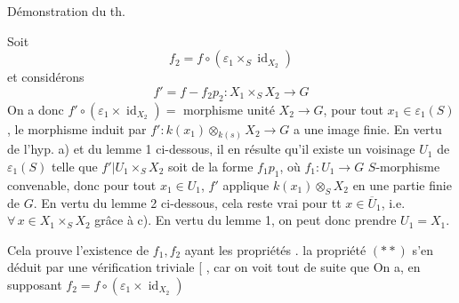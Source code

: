 Démonstration du th.

Soit
\[
f_2=f\circ(\varepsilon_1\times_S\operatorname{id}_{X_2})
\]
et considérons
\[
f'=f-f_2p_2:X_1\times_S X_2\longrightarrow G
\]
  On a donc $f'\circ(\varepsilon_1\times\operatorname{id}_{X_2})={}$ morphisme unité $X_2\to G$,   pour tout $x_1\in\varepsilon_1(S)$, le morphisme induit par $f':k(x_1)\otimes_{k(s)}X_2\longrightarrow G$  a une image finie. En vertu de l'hyp. a) et du lemme 1 ci-dessous, il en résulte qu'il existe un voisinage $U_1$ de $\varepsilon_1(S)$ telle que $f'|U_1\times_S X_2$ soit de la forme $f_1p_1$, où $f_1:U_1\longrightarrow G$  $S$-morphisme convenable, donc pour tout $x_1\in U_1$, $f'$ applique $k(x_1)\otimes_S X_2$ en une partie finie de $G$. En vertu du lemme 2 ci-dessous,  cela reste vrai pour tt $x\in\overline U_1$, i.e. $\forall\,x\in X_1\times_S X_2$ grâce à c). En vertu du lemme 1, on peut donc prendre $U_1=X_1$.

Cela prouve l'existence de $f_1,f_2$ ayant les propriétés  \inserted{$(*)$}.  la propriété $(**)$ s'en déduit par une vérification triviale   [     , car on voit tout de suite que   On a, en supposant $f_2=f\circ(\varepsilon_1\times\operatorname{id}_{X_2})$
